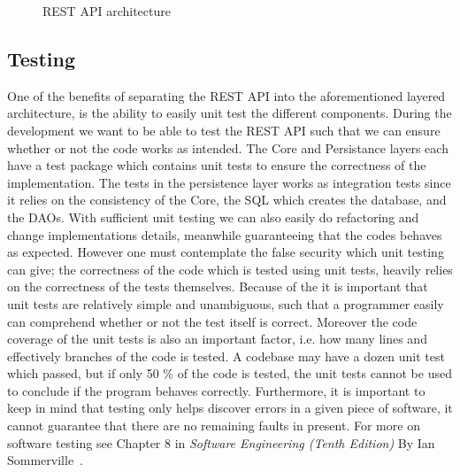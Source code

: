 \begin{figure}[h]
    \centering
    
    \caption{REST API architecture}
    \label{fig:rest-architecture}
\end{figure}


\subsection{Testing}
One of the benefits of separating the REST API into the aforementioned layered architecture, is the ability to easily unit test the different components.
During the development we want to be able to test the REST API such that we can ensure whether or not the code works as intended.
The Core and Persistance layers each have a test package which contains unit tests to ensure the correctness of the implementation.
The tests in the persistence layer works as integration tests since it relies on the consistency of the Core, the SQL which creates the database, and the DAOs.
With sufficient unit testing we can also easily do refactoring and change implementations details, meanwhile guaranteeing that the codes behaves as expected.
However one must contemplate the false security which unit testing can give; the correctness of the code which is tested using unit tests, heavily relies on the correctness of the tests themselves.
Because of the it is important that unit tests are relatively simple and unambiguous, such that a programmer easily can comprehend whether or not the test itself is correct.
Moreover the code coverage of the unit tests is also an important factor, i.e. how many lines and effectively branches of the code is tested.
A codebase may have a dozen unit test which passed, but if only 50 \% of the code is tested, the unit tests cannot be used to conclude if the program behaves correctly.
Furthermore, it is important to keep in mind that testing only helps discover errors in a given piece of software, it cannot guarantee that there are no remaining faults in present. For more on software testing see Chapter 8 in \textit{Software Engineering (Tenth Edition)} By Ian Sommerville~\cite[Chapter~8]{SEBOOK}.

